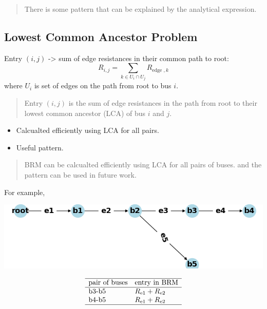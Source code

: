 \documentclass[
]{book}
\providecommand{\tightlist}{%
  \setlength{\itemsep}{0pt}\setlength{\parskip}{0pt}}
\begin{document}
\begin{quote}
There is some pattern that can be explained by the analytical expression.
\end{quote}

\hypertarget{LCA}{%
\subsection*{Lowest Common Ancestor Problem}\label{LCA}}

Entry \((i, j)\) -\textgreater{} sum of edge resistances in their common path to root:
\[
R_{i, j}=\sum_{k \in U_{i} \cap U_{j}} R_{\text {edge }, k}
\]
where \(U_{i}\) is set of edges on the path from root to bus \(i\).

\begin{quote}
Entry \((i, j)\) is the sum of edge resistances in the path from root to their
lowest common ancestor (LCA) of bus \(i\) and \(j\).
\end{quote}

\begin{itemize}
\tightlist
\item
  Calcualted efficiently using LCA for all pairs.
\item
  Useful pattern.
\end{itemize}

\begin{quote}
BRM can be calcualted efficiently using LCA for all pairs of buses. and the
pattern can be used in future work.
\end{quote}

For example,

\begin{center}\includegraphics[width=0.7\linewidth]{Pictures/figCaseSix} \end{center}

\[ \begin{array}{ll}
  \hline
  \text{pair of buses} & \text{entry in BRM} \\
  \hline
  \text{b3-b5} & R_\text{e1} + R_\text{e2} \\
  \text{b4-b5} & R_\text{e1} + R_\text{e2} \\
  \hline
\end{array} \]
\end{document}
